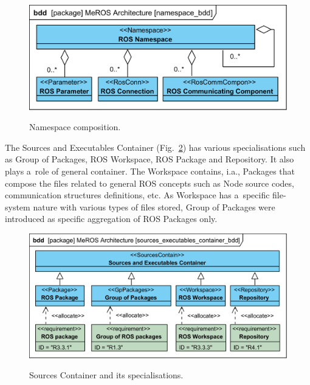 \documentclass[11pt,oneside,a4paper]{report}
\begin{document}
	
	\begin{figure}[H]
		\centering
		\begin{center}
			{\includegraphics[scale=.94]{diagrams/namespace_bdd.png}}
		\end{center}
		\caption{Namespace composition.}
		\label{fig:namespace_bdd}
	\end{figure}
	
	The Sources and Executables Container (Fig.~\ref{fig:sources_executables_container_bdd}) has various specialisations such as Group of Packages, ROS Workspace, ROS Package and Repository. It also plays a~role of general container.  
	The Workspace contains, i.a., Packages that compose the files related to general ROS concepts such as Node source codes, communication structures definitions, etc. As Workspace has a~specific file-system nature with various types of files stored, Group of Packages were introduced as specific aggregation of ROS Packages only.
	
	
	\begin{figure}[H]
		\centering
		\begin{center}
			{\includegraphics[scale=.94]{diagrams/sources_executables_container_bdd.png}}
		\end{center}
		\caption{Sources Container and its specialisations.} 
		\label{fig:sources_executables_container_bdd}
	\end{figure}
	
\end{document}
